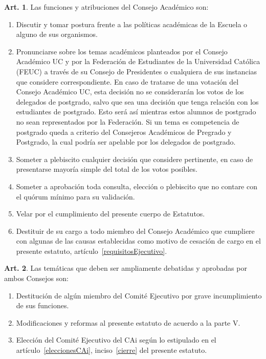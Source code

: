 \documentclass[letterpaper,11pt]{article}
\theoremstyle{definition}%
\newtheorem{art}{Art.} %
\begin{document}
\begin{art}\label{funcionesConsejoAcademico}
	Las funciones y atribuciones del Consejo Académico son:
	\begin{enumerate}
		\item Discutir y tomar postura frente a las políticas académicas de la Escuela o alguno de sus organismos.
		\item Pronunciarse sobre los temas académicos planteados por el Consejo Académico UC y por la Federación de Estudiantes de la Universidad Católica (FEUC) a través de su Consejo de Presidentes o cualquiera de sus instancias que considere correspondiente. En caso de tratarse de
		      una votación del Consejo Académico UC, esta decisión no se considerarán los votos de los delegados de postgrado, salvo que sea una decisión que tenga relación con los estudiantes de postgrado. Esto será así mientras estos alumnos de postgrado no sean representados por la Federación. Si un tema es competencia de postgrado queda a criterio del Consejeros Académicos de Pregrado y Postgrado, la cual podría ser apelable por los delegados de postgrado.
		\item Someter a plebiscito cualquier decisión que considere pertinente, en caso de presentarse mayoría simple del total de los votos posibles.
		\item Someter a aprobación toda consulta, elección o plebiscito que no contare con el quórum mínimo para su validación.
		\item Velar por el cumplimiento del presente cuerpo de Estatutos.
		\item Destituir de su cargo a todo miembro del Consejo Académico que cumpliere con algunas de las causas establecidas como motivo de cesación de cargo en el presente estatuto, artículo~\ref{requisitosEjecutivo}.
	\end{enumerate}
\end{art}

\begin{art}
	Las temáticas que deben ser ampliamente debatidas y aprobadas por ambos Consejos son:
	\begin{enumerate}
		\item Destitución de algún miembro del Comité Ejecutivo por grave incumplimiento de sus funciones.
		\item Modificaciones y reformas al presente estatuto de acuerdo a la parte V.
		\item Elección del Comité Ejecutivo del CAi según lo estipulado en el artículo~\ref{eleccionesCAi}, inciso~\ref{cierre} del presente estatuto.
	\end{enumerate}
\end{art}
\end{document}

